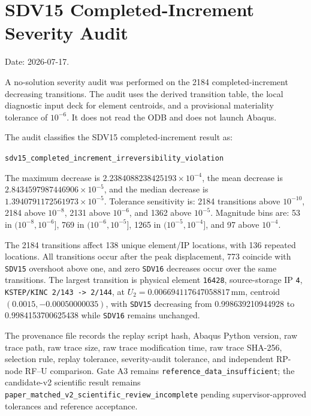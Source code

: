 \documentclass[11pt,a4paper]{article}
\begin{document}
\section{SDV15 Completed-Increment Severity Audit}

Date: 2026-07-17.

A no-solution severity audit was performed on the 2184 completed-increment
decreasing transitions. The audit uses the derived transition table, the local
diagnostic input deck for element centroids, and a provisional materiality
tolerance of \(10^{-6}\). It does not read the ODB and does not launch Abaqus.

The audit classifies the SDV15 completed-increment result as:

\begin{center}
\texttt{sdv15\_completed\_increment\_irreversibility\_violation}
\end{center}

The maximum decrease is \(2.2384088238425193\times10^{-4}\), the mean decrease
is \(2.8434597987446906\times10^{-5}\), and the median decrease is
\(1.3940791172561973\times10^{-5}\). Tolerance sensitivity is: 2184 transitions
above \(10^{-10}\), 2184 above \(10^{-8}\), 2131 above \(10^{-6}\), and 1362
above \(10^{-5}\). Magnitude bins are: 53 in \((10^{-8},10^{-6}]\), 769 in
\((10^{-6},10^{-5}]\), 1265 in \((10^{-5},10^{-4}]\), and 97 above \(10^{-4}\).

The 2184 transitions affect 138 unique element/IP locations, with 136 repeated
locations. All transitions occur after the peak displacement, 773 coincide with
\texttt{SDV15} overshoot above one, and zero \texttt{SDV16} decreases occur over
the same transitions. The largest transition is physical element \texttt{16428},
source-storage IP \texttt{4}, \texttt{KSTEP/KINC 2/143 -> 2/144}, at
\(U_2=0.006694117647058817\,\mathrm{mm}\), centroid
\((0.0015,-0.00050000035)\), with \texttt{SDV15} decreasing from
0.998639210944928 to 0.9984153700625438 while \texttt{SDV16} remains unchanged.

The provenance file
records the replay script hash, Abaqus Python version, raw trace path, raw trace
size, raw trace modification time, raw trace SHA-256, selection rule, replay
tolerance, severity-audit tolerance, and independent RP-node RF--U comparison.
Gate A3 remains \texttt{reference\_data\_insufficient}; the candidate-v2
scientific result remains \texttt{paper\_matched\_v2\_scientific\_review\_incomplete}
pending supervisor-approved tolerances and reference acceptance.
\end{document}
